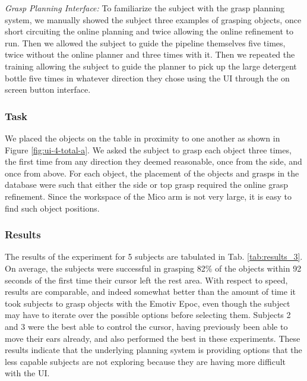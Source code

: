 \emph{Grasp Planning Interface:} To familiarize the subject with the grasp planning system, we manually showed the subject three examples of grasping objects, once short circuiting the online planning and twice allowing the online refinement to run. Then we allowed the subject to guide the pipeline themselves five times, twice without the online planner and three times with it. Then we repeated the training allowing the subject to guide the planner to pick up the large detergent bottle five times in whatever direction they chose using the UI through the on screen button interface. 

\subsubsection{Task}
We placed the objects on the table in proximity to one another as shown in Figure \ref{fig:ui-4-total-a}. We asked the subject to grasp each object three times, the first time from any direction they deemed reasonable, once from the side, and once from above. For each object, the placement of the objects and grasps in the database were such that either the side or top grasp required the online grasp refinement. Since the workspace of the Mico arm is not very large, it is easy to find such object positions. 

\subsubsection{Results}
\label{sec:semg_results}
The results of the experiment for 5 subjects are tabulated in Tab. \ref{tab:results_3}. On average, the subjects were successful in grasping 82\% of the objects within 92 seconds of the first time their cursor left the rest area. With respect to speed,  results are comparable, and indeed somewhat better than the amount of time it took subjects to grasp objects with the Emotiv Epoc, even though the subject may have to iterate over the possible options before selecting them. Subjects 2 and 3 were the best able to control the cursor, having previously been able to move their ears already, and also performed the best in these experiments. These results indicate that the underlying planning system is providing options that the less capable subjects are not exploring because they are having more difficult with the UI. 

